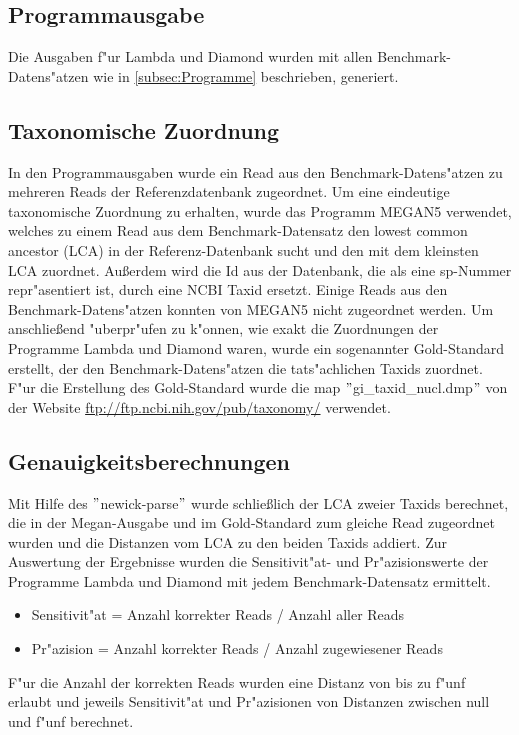 \documentclass[10pt, a4paper]{report}[08.12.2015]
\begin{document}
      \subsection{Programmausgabe}
      Die Ausgaben f"ur Lambda und Diamond wurden mit allen Benchmark-Datens"atzen wie in \ref{subsec:Programme} beschrieben, generiert.
      
            \subsection{Taxonomische Zuordnung}
      In den Programmausgaben wurde ein Read aus den Benchmark-Datens"atzen zu mehreren Reads der Referenzdatenbank zugeordnet. Um eine eindeutige taxonomische Zuordnung zu erhalten, wurde das Programm MEGAN5 verwendet, welches zu einem Read aus dem Benchmark-Datensatz den lowest common ancestor (LCA) in der Referenz-Datenbank sucht und den mit dem kleinsten LCA zuordnet. Au{\ss}erdem wird die Id aus der Datenbank, die als eine sp-Nummer repr"asentiert ist, durch eine NCBI Taxid ersetzt. Einige Reads aus den Benchmark-Datens"atzen konnten von MEGAN5 nicht zugeordnet werden. \newline \newline
      Um anschlie{\ss}end "uberpr"ufen zu k"onnen, wie exakt die Zuordnungen der Programme Lambda und Diamond waren, wurde ein sogenannter Gold-Standard erstellt, der den Benchmark-Datens"atzen die tats"achlichen Taxids zuordnet. F"ur die Erstellung des Gold-Standard wurde die map $"$gi\_taxid\_nucl.dmp$"$ von der Website  \url{ftp://ftp.ncbi.nih.gov/pub/taxonomy/} verwendet.
      
      \subsection{Genauigkeitsberechnungen}
             \label{subsec:Genauigkeitsberechnungen}

      Mit Hilfe des $"$newick-parse$"$ wurde schlie{\ss}lich der LCA zweier Taxids berechnet, die in der Megan-Ausgabe und im Gold-Standard zum gleiche Read zugeordnet wurden und die Distanzen vom LCA zu den beiden Taxids addiert. Zur Auswertung der Ergebnisse wurden die Sensitivit"at- und Pr"azisionswerte der Programme Lambda und Diamond mit jedem Benchmark-Datensatz ermittelt.
      \begin{itemize}
      \item[] Sensitivit"at = Anzahl korrekter Reads / Anzahl aller Reads
      \item[] Pr"azision = Anzahl korrekter Reads / Anzahl zugewiesener Reads
      \end{itemize}
      F"ur die Anzahl der korrekten Reads wurden eine Distanz von bis zu f"unf erlaubt und jeweils Sensitivit"at und Pr"azisionen von Distanzen zwischen null und f"unf berechnet. 
      
\end{document}
